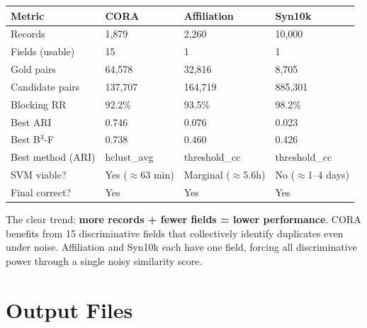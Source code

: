 \documentclass[11pt, a4paper]{article}
\begin{document}
\begin{table}[h!]
\centering
\begin{tabular}{llll}
\toprule
\textbf{Metric} & \textbf{CORA} & \textbf{Affiliation} & \textbf{Syn10k} \\
\midrule
Records              & 1,879   & 2,260   & 10,000 \\
Fields (usable)      & 15      & 1       & 1 \\
Gold pairs           & 64,578  & 32,816  & 8,705 \\
Candidate pairs      & 137,707 & 164,719 & 885,301 \\
Blocking RR          & 92.2\%  & 93.5\%  & 98.2\% \\
Best ARI             & 0.746   & 0.076   & 0.023 \\
Best B$^3$-F         & 0.738   & 0.460   & 0.426 \\
Best method (ARI)    & hclust\_avg & threshold\_cc & threshold\_cc \\
SVM viable?          & Yes ($\approx$63 min) & Marginal ($\approx$5.6h) & No ($\approx$1--4 days) \\
Final correct?       & Yes     & Yes     & Yes \\
\bottomrule
\end{tabular}
\end{table}

The clear trend: \textbf{more records + fewer fields = lower performance}. CORA benefits
from 15 discriminative fields that collectively identify duplicates even under noise.
Affiliation and Syn10k each have one field, forcing all discriminative power through a
single noisy similarity score.

\section{Output Files}
\end{document}
